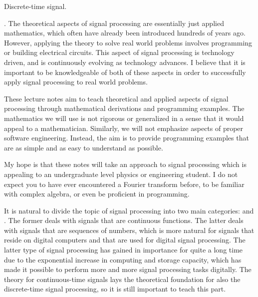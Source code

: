 \begin{marginfigure}%
	\begin{center}
	\end{center}
	\caption{Discrete-time signal.}
	\label{fig:dtfig_intro}
\end{marginfigure}

. The theoretical
aspects of signal processing are essentially just applied mathematics,
which often have already been introduced hundreds of years
ago. However, applying the theory to solve real world problems
involves programming or building electrical circuits. This aspect
of signal processing is technology driven, and is continuously
evolving as technology advances. I believe that it is important to be
knowledgeable of both of these aspects in order to successfully apply
signal processing to real world problems.

These lecture notes aim to teach theoretical and applied aspects of signal
processing through mathematical derivations and programming
examples. The mathematics we will use is not rigorous or generalized
in a sense that it would appeal to a mathematician. Similarly, we will
not emphasize aspects of proper software engineering. Instead, the aim
is to provide programming examples that are as simple and as easy to
understand as possible.

My hope is that these notes will take an approach to signal processing
which is appealing to an undergraduate level physics or engineering
student. I do not expect you to have ever encountered a Fourier
transform before, to be familiar with complex algebra, or even be
proficient in programming.

It is natural to divide the topic of signal processing into two main
categories: \emph{}
and \emph{}. The former deals with
signals that are continuous functions. The latter deals with signals
that are sequences of numbers, which is more natural for signals that
reside on digital computers and that are used for digital signal
processing. The latter type of signal processing has gained in
importance for quite a long time due to the exponential increase in
computing and storage capacity, which has made it possible to perform
more and more signal processing tasks digitally. The theory for
continuous-time signals lays the theoretical foundation for also the
discrete-time signal processing, so it is still important to teach
this part.

